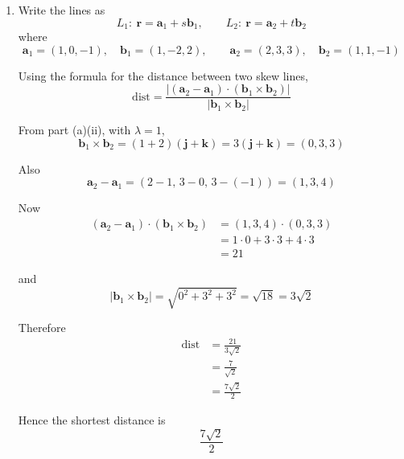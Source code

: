 \documentclass[leqno]{article}
\begin{document}
\begin{enumerate}[
  label=\textbf{\arabic*.},
  leftmargin=*,
  topsep=0pt,
  partopsep=0pt,
  parsep=0pt
]
\begin{tcolorbox}[colback=white, colframe=scarlet, title={\textbf{Solution}}, breakable, grow to left by=6mm, grow to right by=10mm]
\begin{enumerate}[label=\textbf{(\alph*)}]
\begin{enumerate}[label=(\roman*)]
    Therefore
    \[
    \theta=\cos^{-1}\left(\frac{1}{3}\right)\approx 70.5^\circ
    \]

    Hence the acute angle between the planes is \(\cos^{-1}\left(\frac{1}{3}\right)\approx 70.5^\circ\).

    \item
    Write the lines as
    \[
    L_1:\ \mathbf{r}=\mathbf{a}_1+s\mathbf{b}_1,
    \qquad
    L_2:\ \mathbf{r}=\mathbf{a}_2+t\mathbf{b}_2
    \]
    where
    \[
    \mathbf{a}_1=(1,0,-1),\quad \mathbf{b}_1=(1,-2,2),
    \qquad
    \mathbf{a}_2=(2,3,3),\quad \mathbf{b}_2=(1,1,-1)
    \]

    Using the formula for the distance between two skew lines,
    \[
    \mathrm{dist}
    =
    \frac{\left\lvert(\mathbf{a}_2-\mathbf{a}_1)\cdot(\mathbf{b}_1\times\mathbf{b}_2)\right\rvert}
    {\left\lvert\mathbf{b}_1\times\mathbf{b}_2\right\rvert}
    \]

    From part (a)(ii), with \(\lambda=1\),
    \[
    \mathbf{b}_1\times\mathbf{b}_2
    =(1+2)(\mathbf{j}+\mathbf{k})
    =3(\mathbf{j}+\mathbf{k})
    =(0,3,3)
    \]

    Also
    \[
    \mathbf{a}_2-\mathbf{a}_1
    =(2-1,\,3-0,\,3-(-1))
    =(1,3,4)
    \]

    Now
    \begin{align*}
    (\mathbf{a}_2-\mathbf{a}_1)\cdot(\mathbf{b}_1\times\mathbf{b}_2)
    &=
    (1,3,4)\cdot(0,3,3)\\
    &=
    1\cdot 0+3\cdot 3+4\cdot 3\\
    &=
    21
    \end{align*}

    and
    \[
    \left\lvert\mathbf{b}_1\times\mathbf{b}_2\right\rvert
    =\sqrt{0^2+3^2+3^2}
    =\sqrt{18}
    =3\sqrt{2}
    \]

    Therefore
    \begin{align*}
    \mathrm{dist}
    &=
    \frac{21}{3\sqrt{2}}\\
    &=
    \frac{7}{\sqrt{2}}\\
    &=
    \frac{7\sqrt{2}}{2}
    \end{align*}

    Hence the shortest distance is
    \[
    \frac{7\sqrt{2}}{2}
    \]
  \end{enumerate}
\end{enumerate}
\end{tcolorbox}

\end{enumerate}
\end{document}
